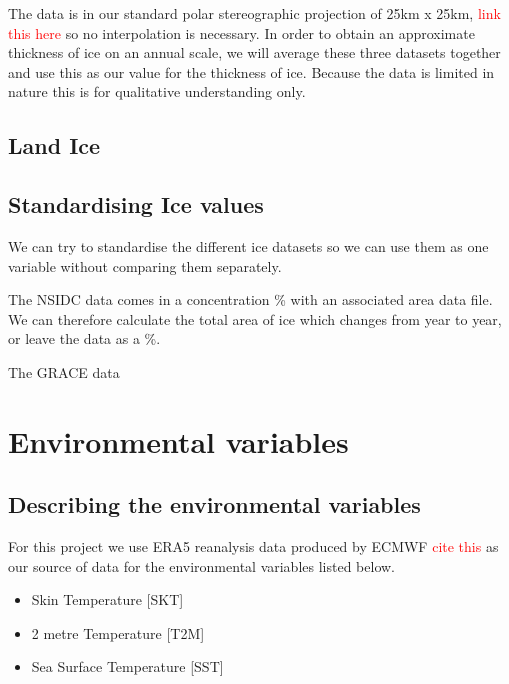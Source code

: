\documentclass[../main.tex]{subfiles}
\begin{document}
The data is in our standard polar stereographic projection of 25km x 25km, \textcolor{red}{link this here} so no interpolation is necessary. In order to obtain an approximate thickness of ice on an annual scale, we will average these three datasets together and use this as our value for the thickness of ice. Because the data is limited in nature this is for qualitative understanding only.

\subsection*{Land Ice}
\subsection*{Standardising Ice values}

We can try to standardise the different ice datasets so we can use them as one variable without comparing them separately.

The NSIDC data comes in a concentration \% with an associated area data file. We can therefore calculate the total area of ice which changes from year to year, or leave the data as a \%.

The GRACE data



\section{Environmental variables}

\subsection{Describing the environmental variables}

For this project we use ERA5 reanalysis data produced by ECMWF \textcolor{red}{cite this} as our source of data for the environmental variables listed below.

\begin{itemize}
	\item Skin Temperature [SKT]
	\item 2 metre Temperature [T2M]
	\item Sea Surface Temperature [SST]
\end{itemize}
\end{document}
